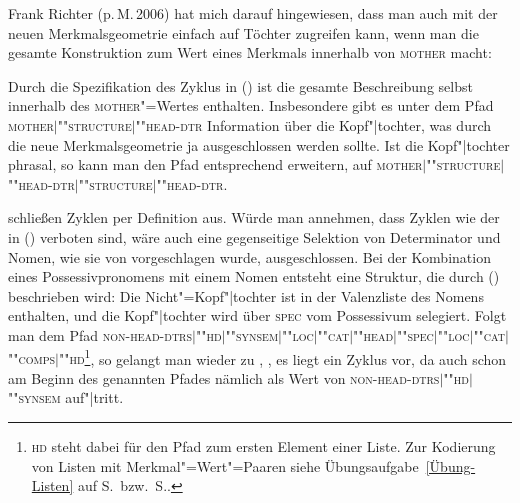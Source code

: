 Frank Richter (p.\,M.\,2006) hat mich darauf hingewiesen, dass man auch mit
der neuen Merkmalsgeometrie einfach auf Töchter zugreifen kann, wenn man die gesamte Konstruktion
zum Wert eines Merkmals innerhalb von \textsc{mother} macht:

\ea
{} 
\z
Durch die Spezifikation des Zyklus in () ist die gesamte Beschreibung selbst innerhalb des
\textsc{mother}"=Wertes enthalten. Insbesondere gibt es unter dem Pfad
\textsc{mother$|$""struc\-ture$|$""head-dtr} Information über die Kopf"|tochter, was durch die neue 
Merkmalsgeometrie ja ausgeschlossen werden sollte. Ist die Kopf"|tochter phrasal, so kann man den Pfad
entsprechend erweitern, \zb auf  \textsc{mother$|$""struc\-ture$|$""head-dtr$|$""struc\-ture$|$""head-dtr}.

\citet[]{ps} schließen Zyklen per Definition aus. Würde man annehmen, dass
Zyklen wie der in () verboten sind, wäre auch eine gegenseitige Selektion von Determinator und Nomen, wie sie von
\citet[Abschnitt~1.8]{ps2} vorgeschlagen wurde, %
ausgeschlossen. Bei der Kombination eines Possessivpronomens mit einem Nomen entsteht eine Struktur, die durch ()
beschrieben wird:
\ea
{}
\z
Die Nicht"=Kopf"|tochter ist in der Valenzliste des Nomens enthalten, und die Kopf"|tochter wird
über \textsc{spec} vom Possessivum selegiert. Folgt man dem Pfad
\textsc{non-head-dtrs$|$""hd$|$""synsem$|$""loc$|$""cat$|$""head$|$""spec$|$""loc$|$""cat$|$""comps$|$""hd}\footnote{
  \textsc{hd} steht dabei für den Pfad zum ersten Element einer Liste. Zur Kodierung von Listen mit
  Merkmal"=Wert"=Paaren siehe Übungsaufgabe~\ref{Übung-Listen} auf S.\,\pageref{Übung-Listen} bzw.\ S.\pageref{Seite-Lösungen-Listen}.%
}, so gelangt man wieder zu , \dash, es liegt ein Zyklus vor, da  auch schon am
Beginn des genannten Pfades nämlich als Wert von \textsc{non-head-dtrs$|$""hd$|$""synsem} auf"|tritt.


